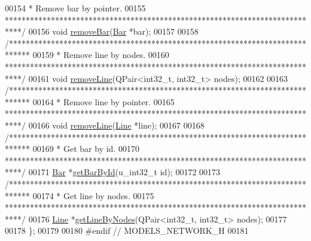 \begin{DoxyCode}
00154 \textcolor{comment}{   * Remove bar by pointer.}
00155 \textcolor{comment}{   ****************************************************************************/}
00156   \textcolor{keywordtype}{void} \hyperlink{group___graphics_ga997ce4f03d316b9f138f2e64e6ca400c}{removeBar}(\hyperlink{class_bar}{Bar} *bar);
00157 
00158   \textcolor{comment}{/*****************************************************************************}
00159 \textcolor{comment}{   * Remove line by nodes.}
00160 \textcolor{comment}{   ****************************************************************************/}
00161   \textcolor{keywordtype}{void} \hyperlink{group___graphics_ga1eef3317224a7a06348fce07e581a9ad}{removeLine}(QPair<int32\_t, int32\_t> nodes);
00162 
00163   \textcolor{comment}{/*****************************************************************************}
00164 \textcolor{comment}{   * Remove line by pointer.}
00165 \textcolor{comment}{   ****************************************************************************/}
00166   \textcolor{keywordtype}{void} \hyperlink{group___graphics_ga1eef3317224a7a06348fce07e581a9ad}{removeLine}(\hyperlink{class_line}{Line} *line);
00167 
00168   \textcolor{comment}{/*****************************************************************************}
00169 \textcolor{comment}{   * Get bar by id.}
00170 \textcolor{comment}{   ****************************************************************************/}
00171   \hyperlink{class_bar}{Bar} *\hyperlink{group___graphics_ga9c5806f5a0d236bb6d8abbdce62d9675}{getBarById}(u\_int32\_t \textcolor{keywordtype}{id});
00172 
00173   \textcolor{comment}{/*****************************************************************************}
00174 \textcolor{comment}{   * Get line by nodes.}
00175 \textcolor{comment}{   ****************************************************************************/}
00176   \hyperlink{class_line}{Line} *\hyperlink{group___graphics_ga8f090b85a7779695cb9f05b6395b3044}{getLineByNodes}(QPair<int32\_t, int32\_t> nodes);
00177 
00178 \};
00179 
00180 \textcolor{preprocessor}{#endif  // MODELS\_NETWORK\_H}
00181 
\end{DoxyCode}
